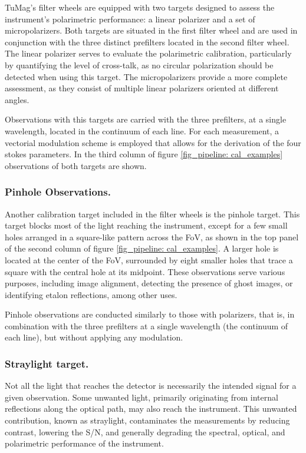 TuMag's filter wheels are equipped with two targets designed to assess the instrument's polarimetric performance: a linear polarizer and a set of micropolarizers. Both targets are situated in the first filter wheel and are used in conjunction with the three distinct prefilters located in the second filter wheel. The linear polarizer serves to evaluate the polarimetric calibration, particularly by quantifying the level of cross-talk, as no circular polarization should be detected when using this target. The micropolarizers provide a more complete assessment, as they consist of multiple linear polarizers oriented at different angles. 

Observations with this targets are carried with the three prefilters, at a single wavelength, located in the continuum of each line. For each measurement, a vectorial modulation scheme is employed that allows for the derivation of the four stokes parameters. In the third column of figure \ref{fig_pipeline: cal_examples} observations of both targets are shown. 

\subsubsection{Pinhole Observations.}

Another calibration target included in the filter wheels is the pinhole target. This target blocks most of the light reaching the instrument, except for a few small holes arranged in a square-like pattern across the FoV, as shown in the top panel of the second column of figure \ref{fig_pipeline: cal_examples}. A larger hole is located at the center of the FoV, surrounded by eight smaller holes that trace a square with the central hole at its midpoint. These observations serve various purposes, including image alignment, detecting the presence of ghost images, or identifying etalon reflections, among other uses.

Pinhole observations are conducted similarly to those with polarizers, that is, in combination with the three prefilters at a single wavelength (the continuum of each line), but without applying any modulation.

\subsubsection{Straylight target.}

Not all the light that reaches the detector is necessarily the intended signal for a given observation. Some unwanted light, primarily originating from internal reflections along the optical path, may also reach the instrument. This unwanted contribution, known as straylight, contaminates the measurements by reducing contrast, lowering the S/N, and generally degrading the spectral, optical, and polarimetric performance of the instrument.

